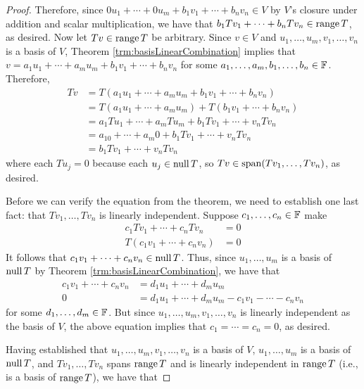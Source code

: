 \documentclass[../main.tex]{subfiles}
\begin{document}
\begin{itemize}
\begin{theorem}
\begin{proof}
            Therefore, since $0u_1+\cdots+0u_m+b_1v_1+\cdots+b_nv_n\in V$ by $V$'s closure under addition and scalar multiplication, we have that $b_1Tv_1+\cdots+b_nTv_n\in\operatorname{range} T$, as desired. Now let $Tv\in\operatorname{range} T$ be arbitrary. Since $v\in V$ and $u_1,\dots,u_m,v_1,\dots,v_n$ is a basis of $V$, Theorem \ref{trm:basisLinearCombination} implies that $v=a_1u_1+\cdots+a_mu_m+b_1v_1+\cdots+b_nv_n$ for some $a_1,\dots,a_m,b_1,\dots,b_n\in\mathbb{F}$. Therefore,
            \begin{align*}
                Tv &= T(a_1u_1+\cdots+a_mu_m+b_1v_1+\cdots+b_nv_n)\\
                &= T(a_1u_1+\cdots+a_mu_m)+T(b_1v_1+\cdots+b_nv_n)\\
                &= a_1Tu_1+\cdots+a_mTu_m+b_1Tv_1+\cdots+v_nTv_n\\
                &= a_10+\cdots+a_m0+b_1Tv_1+\cdots+v_nTv_n\\
                &= b_1Tv_1+\cdots+v_nTv_n
            \end{align*}
            where each $Tu_j=0$ because each $u_j\in\operatorname{null} T$, so $Tv\in\operatorname{span}(Tv_1,\dots,Tv_n)$, as desired.\par
            Before we can verify the equation from the theorem, we need to establish one last fact: that $Tv_1,\dots,Tv_n$ is linearly independent. Suppose $c_1,\dots,c_n\in\mathbb{F}$ make
            \begin{align*}
                c_1Tv_1+\cdots+c_nTv_n &= 0\\
                T(c_1v_1+\cdots+c_nv_n) &= 0
            \end{align*}
            It follows that $c_1v_1+\cdots+c_nv_n\in\operatorname{null} T$. Thus, since $u_1,\dots,u_m$ is a basis of $\operatorname{null} T$ by Theorem \ref{trm:basisLinearCombination}, we have that
            \begin{align*}
                c_1v_1+\cdots+c_nv_n &= d_1u_1+\cdots+d_mu_m\\
                0 &= d_1u_1+\cdots+d_mu_m-c_1v_1-\cdots-c_nv_n
            \end{align*}
            for some $d_1,\dots,d_m\in\mathbb{F}$. But since $u_1,\dots,u_m,v_1,\dots,v_n$ is linearly independent as the basis of $V$, the above equation implies that $c_1=\cdots=c_n=0$, as desired.\par
            Having established that $u_1,\dots,u_m,v_1,\dots,v_n$ is a basis of $V$, $u_1,\dots,u_m$ is a basis of $\operatorname{null} T$, and $Tv_1,\dots,Tv_n$ spans $\operatorname{range} T$ and is linearly independent in $\operatorname{range} T$ (i.e., is a basis of $\operatorname{range} T$), we have that

\end{proof}
\end{theorem}
\end{itemize}
\end{document}
